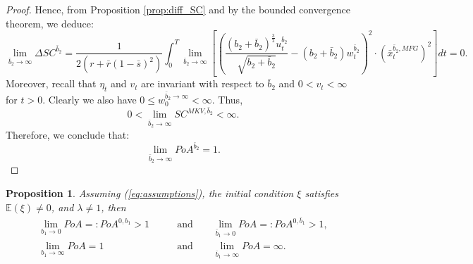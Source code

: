 \documentclass[11pt]{article}
\newtheorem{proposition}{Proposition}
\begin{document}
\begin{proof}
	Hence, from Proposition \ref{prop:diff_SC} and by the bounded convergence theorem, we deduce:
	$$ \lim_{\bar{b}_2 \to \infty} \Delta SC^{\bar{b}_2} =  \frac{1}{2(r+ \bar{r}(1-\bar{s})^2)} \int_0^T \lim_{\bar{b}_2 \to \infty}\left[ \left( \frac{ (b_2 + \bar{b}_2)^{\frac{3}{2}} u^{\bar{b}_2}_t }{\sqrt{b_2 + \bar{b}_2}} - (b_2 + \bar{b}_2)w^{\bar{b}_2}_t \right)^2 \cdot \left(\bar{x}_t^{\bar{b}_2,MFG} \right)^2\right] dt = 0.$$	
	Moreover, recall that $\eta_t$ and $v_t$ are invariant with respect to $\bar{b}_2$ and $0<v_t<\infty$ for $t>0$. Clearly we also have $0 \leq w^{\bar{b}_2 \to \infty}_0 < \infty$. Thus,
	$$0< \lim_{\bar{b}_2 \to \infty} SC^{MKV,\bar{b}_2} <\infty.$$
	Therefore, we conclude that:
	$$ \lim_{\bar{b}_2 \to \infty} PoA^{\bar{b}_2} = 1.$$
\end{proof}

\begin{proposition}\label{prop:b1_b1bar}
	Assuming (\ref{eq:assumptions}), the initial condition $\xi$ satisfies $\mathbb{E}(\xi)\neq 0$, and $\lambda \neq 1$, then
	\begin{equation*}
	\begin{split}
	    \lim_{b_1 \to 0} PoA =: PoA^{0,b_1} > 1\qquad &\text{and} \qquad \lim_{\bar{b}_1 \to 0} PoA =: PoA^{0,\bar{b}_1} > 1,\\
	    \lim_{b_1 \to \infty} PoA = 1 \qquad &\text{and} \qquad\lim_{\bar{b}_1 \to \infty} PoA =\infty.
	\end{split}
	\end{equation*}
\end{proposition}
\end{document}
